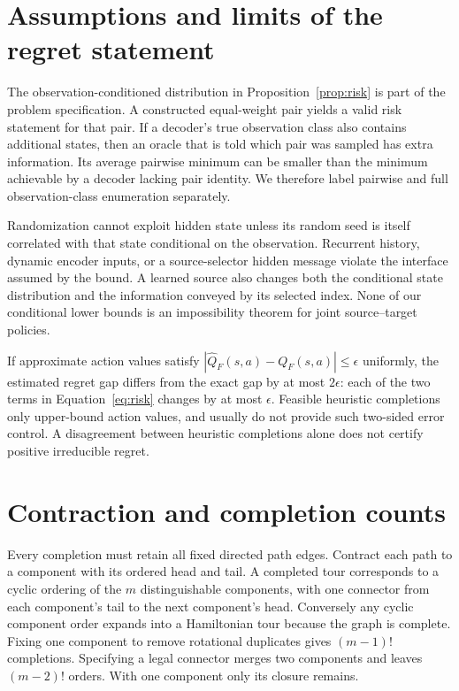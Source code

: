 \section{Assumptions and limits of the regret statement}
The observation-conditioned distribution in Proposition~\ref{prop:risk} is
part of the problem specification. A constructed equal-weight pair yields a
valid risk statement for that pair. If a decoder's true observation class also
contains additional states, then an oracle that is told which pair was sampled
has extra information. Its average pairwise minimum can be smaller than the
minimum achievable by a decoder lacking pair identity. We therefore label
pairwise and full observation-class enumeration separately.

Randomization cannot exploit hidden state unless its random seed is itself
correlated with that state conditional on the observation. Recurrent history,
dynamic encoder inputs, or a source-selector hidden message violate the
interface assumed by the bound. A learned source also changes both the
conditional state distribution and the information conveyed by its selected
index. None of our conditional lower bounds is an impossibility theorem for
joint source--target policies.

If approximate action values satisfy
$|\widehat Q_F(s,a)-Q_F(s,a)|\leq\epsilon$ uniformly, the estimated regret
gap differs from the exact gap by at most $2\epsilon$: each of the two terms
in Equation~\eqref{eq:risk} changes by at most $\epsilon$. Feasible heuristic
completions only upper-bound action values, and usually do not provide such
two-sided error control. A disagreement between heuristic completions alone
does not certify positive irreducible regret.

\section{Contraction and completion counts}
Every completion must retain all fixed directed path edges. Contract each path
to a component with its ordered head and tail. A completed tour corresponds to
a cyclic ordering of the $m$ distinguishable components, with one connector
from each component's tail to the next component's head. Conversely any
cyclic component order expands into a Hamiltonian tour because the graph is
complete. Fixing one component to remove rotational duplicates gives
$(m-1)!$ completions. Specifying a legal connector merges two components and
leaves $(m-2)!$ orders. With one component only its closure remains.

